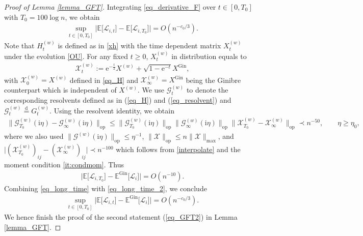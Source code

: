 \documentclass[10pt,reqno]{amsart}
\numberwithin{equation}{section}
\numberwithin{figure}{section}
\theoremstyle{plain}
\newcommand{\ii}{\mathrm{i}}
\newcommand{\<}{\langle}
\renewcommand{\>}{\rangle}
\begin{document}
\begin{proof}[Proof of Lemma \ref{lemma_GFT}]
Integrating \eqref{eq_derivative_F} over $t \in [0, T_0]$ with  $T_0=100\log n$,  we obtain 
\begin{align}\label{eq_long_time}
	\sup_{t \in [0,T_0]}\Big| \mathbb{E}\big[ \mathcal{L}_{i,t}\big]-\mathbb{E}\big[ \mathcal{L}_{i,T_0}\big] \Big| =O(n^{-c_0/3}). 
\end{align}
Note that $H^{(w)}_{t}$ is defined as in \eqref{xh} with the time dependent matrix $X^{(w)}_t$ under the evolution \eqref{OU}. For any fixed $t\ge 0$, $X^{(w)}_t$ in distribution equals to
\begin{align}\label{interpolate}
 \mathcal{X}^{(w)}_t := \mathrm{e}^{-\frac{t}{2}} X^{(w)}+\sqrt{1-\mathrm{e}^{-t}} {X^{\mathrm{Gin}}},
\end{align}
with $\mathcal{X}^{(w)}_0=X^{(w)}$ defined in \eqref{eq_H} and $\mathcal{X}^{(w)}_\infty={X^{\mathrm{Gin}}}$ being the Ginibre counterpart which is independent of $X^{(w)}$. We use $\mathcal{G}_t^{(w)}$ to denote the corresponding resolvents defined as in (\ref{eq_H}) and (\ref{eq_resolvent}) and $\mathcal{G}_t^{(w)} \overset{\mathrm{d}}{=} G_t^{(w)}$. Using the resolvent identity, we obtain
\begin{align}\label{eq_final}
	\|\mathcal{G}^{(w)}_{T_0}(\ii \eta)-\mathcal{G}^{(w)}_{\infty}(\ii \eta)\|_{\mathrm{op}} \leq \|\mathcal{G}^{(w)}_{T_0}(\ii \eta)\|_{\mathrm{op}} \|\mathcal{G}^{(w)}_{\infty}(\ii \eta)\|_{\mathrm{op}}\|\mathcal{X}^{(w)}_{T_0}-\mathcal{X}^{(w)}_{\infty}\|_{\mathrm{op}} 
	\prec n^{-50}, \qquad \eta \geq \eta_0,
\end{align}
where we also used  $\|\mathcal{G}^{(w)}(\ii \eta)\|_{\mathrm{op}} \leq \eta^{-1}$, $\|\mathcal{X}\|_{\mathrm{op}} \leq n \|\mathcal{X}\|_{\mathrm{max}}$, and $\big|(\mathcal{X}^{(w)}_{T_0})_{ij}-(\mathcal{X}^{(w)}_{\infty})_{ij}\big| \prec n^{-100}$ which follows from \eqref{interpolate} and the moment condition \ref{it:condmom}. Thus 
\begin{align}\label{eq_long_time_2}
		\Big| \mathbb{E}\big[ \mathcal{L}_{i,T_0}\big]-\mathbb{E}^{\mathrm{Gin}}\big[ \mathcal{L}_{i}\big] \Big|  =O(n^{-10}). 
\end{align}
Combining \eqref{eq_long_time} with \eqref{eq_long_time_2}, we conclude
\begin{align}\label{eq_conclude}
	\sup_{t \in [0,T_0]}\Big| \mathbb{E}\big[ \mathcal{L}_{i,t}\big]-\mathbb{E}^{\mathrm{Gin}}\big[ \mathcal{L}_{i}\big]  \Big| =O(n^{-c_0/3}). 
\end{align}
We hence finish the proof of the second statement (\ref{eq_GFT2}) in Lemma \ref{lemma_GFT}.





\end{proof}
\end{document}
